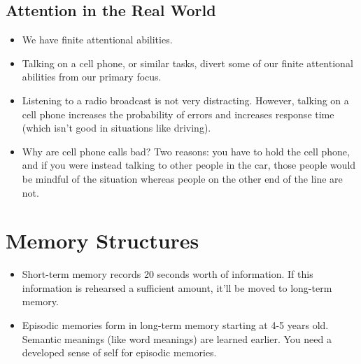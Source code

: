 \documentclass[]{article}
\begin{document}
		\subsection{Attention in the Real World}
			\begin{itemize}
				\item We have finite attentional abilities.
				\item Talking on a cell phone, or similar tasks, divert some of our finite attentional abilities from our primary focus.
				\item Listening to a radio broadcast is not very distracting. However, talking on a cell phone increases the probability of errors and increases response time (which isn't good in situations like driving).
				\item Why are cell phone calls bad? Two reasons: you have to hold the cell phone, and if you were instead talking to other people in the car, those people would be mindful of the situation whereas people on the other end of the line are not.
			\end{itemize}
	
	\section{Memory Structures}
		\begin{itemize}
			\item Short-term memory records 20 seconds worth of information. If this information is rehearsed a sufficient amount, it'll be moved to long-term memory.
			\item Episodic memories form in long-term memory starting at 4-5 years old. Semantic meanings (like word meanings) are learned earlier. You need a developed sense of self for episodic memories.
		\end{itemize}
\end{document}
